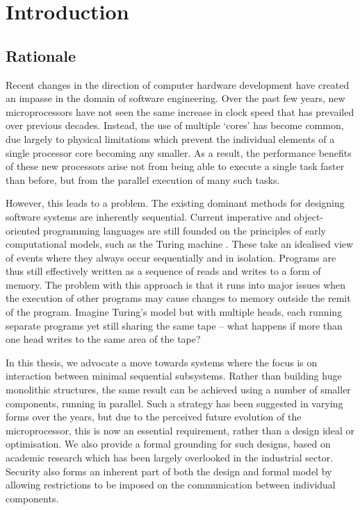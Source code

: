 \chapter{Introduction}
\label{introduction}

\section{Rationale}

Recent changes in the direction of computer hardware development have
created an impasse in the domain of software engineering.  Over the
past few years, new microprocessors have not seen the same increase in
clock speed that has prevailed over previous decades.  Instead, the
use of multiple `cores' has become common, due largely to physical
limitations which prevent the individual elements of a single
processor core becoming any smaller.  As a result, the performance
benefits of these new processors arise not from being able to execute
a single task faster than before, but from the parallel execution of
many such tasks.

However, this leads to a problem.  The existing dominant methods for
designing software systems are inherently sequential.  Current
imperative and object-oriented programming languages are still founded
on the principles of early computational models, such as the Turing
machine \cite{turing:36}.  These take an idealised view of events
where they always occur sequentially and in isolation.  Programs are
thus still effectively written as a sequence of reads and writes to a
form of memory.  The problem with this approach is that it runs into
major issues when the execution of other programs may cause changes to
memory outside the remit of the program.  Imagine Turing's model but
with multiple heads, each running separate programs yet still sharing
the same tape -- what happens if more than one head writes to the same
area of the tape?

In this thesis, we advocate a move towards systems where the focus is
on interaction between minimal sequential subsystems.  Rather than
building huge monolithic structures, the same result can be achieved
using a number of smaller components, running in parallel.  Such a
strategy has been suggested in varying forms over the years, but due to
the perceived future evolution of the microprocessor, this is now an
essential requirement, rather than a design ideal or optimisation.  We
also provide a formal grounding for such designs, based on academic
research which has been largely overlooked in the industrial sector.
Security also forms an inherent part of both the design and formal
model by allowing restrictions to be imposed on the communication
between individual components.

